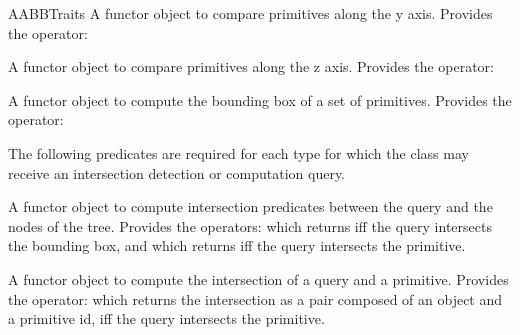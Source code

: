 \begin{ccRefConcept}{AABBTraits}
{A functor object to compare primitives along the y axis. Provides the operator:
}

{A functor object to compare primitives along the z axis. Provides the operator:
}

{A functor object to compute the bounding box of a set of primitives. Provides the operator:
}

The following predicates are required for each type 
for which the class  may receive an intersection detection or computation query.

{} 
{A functor object to compute intersection predicates between the query and the nodes of the tree. Provides the operators:
 which returns  iff the query intersects the bounding box, and  which returns  iff the query intersects the primitive.}

{} 
{A functor object to compute the intersection of a query and a primitive. Provides the operator:
 which returns the intersection as a pair composed of an object and a primitive id, iff the query intersects the primitive.}


\end{ccRefConcept}
